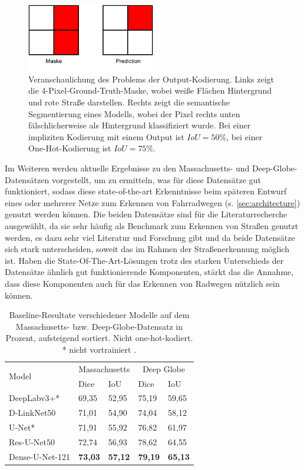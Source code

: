 \begin{figure}
	\centering
	\includegraphics[width=0.5\textwidth]{Bilder/output-enc-example.drawio.pdf} 
	\vspace{-5pt}
	\caption{Veranschaulichung des Problems der Output-Kodierung. Links zeigt die 4-Pixel-Ground-Truth-Maske, 
	wobei weiße Flächen Hintergrund und rote Straße darstellen. Rechts zeigt die semantische Segmentierung 
	eines Modells, wobei der Pixel rechts unten fälschlicherweise als Hintergrund klassifiziert wurde.
	Bei einer impliziten Kodierung mit einem Output ist $IoU = 50\%$, bei einer One-Hot-Kodierung ist $IoU = 75\%$.}
	\label{fig:problematic-output}
\end{figure} 

Im Weiteren werden aktuelle Ergebnisse zu den Massachusetts- und Deep-Globe-Datensätzen vorgestellt, 
um zu ermitteln, was für diese Datensätze gut funktioniert, sodass diese state-of-the-art Erkenntnisse beim 
späteren Entwurf eines oder mehrerer Netze zum Erkennen von Fahrradwegen (s. \autoref{sec:architecture}) 
genutzt werden können. Die beiden Datensätze sind für die Literaturrecherche ausgewählt, 
da sie sehr häufig als Benchmark zum Erkennen von Straßen genutzt werden, es dazu sehr viel Literatur und 
Forschung gibt und da beide Datensätze sich stark unterscheiden, soweit das im Rahmen der Straßenerkennung möglich ist. 
Haben die State-Of-The-Art-Lösungen trotz des starken Unterschieds der Datensätze ähnlich gut funktionierende
Komponenten, stärkt das die Annahme, dass diese Komponenten auch für das Erkennen von Radwegen nützlich sein können. 

\begin{table}[H]
	\centering
	\begin{tabular}{l|l|l|l|l}
		\multirow{2}{*}{Model} & \multicolumn{2}{c|}{Massachusetts} & \multicolumn{2}{c}{Deep Globe}  \\
		& Dice & IoU & Dice & IoU \\
		\midrule
		DeepLabv3+* & 69,35 & 52,95 & 75,19 & 59,65 \\
		D-LinkNet50 & 71,01 & 54,90 & 74,04 & 58,12 \\
		U-Net* & 71,91 & 55,92 & 76,82 & 61,97 \\
		Res-U-Net50 & 72,74 & 56,93 & 78,62 & 64,55  \\
		Dense-U-Net-121 & \textbf{73,03} & \textbf{57,12} & \textbf{79,19} & \textbf{65,13}  \\
	\end{tabular}
	\caption{Baseline-Resultate verschiedener Modelle auf dem Massachusetts- 
	bzw. Deep-Globe-Datensatz in Prozent, aufsteigend sortiert. Nicht one-hot-kodiert. \\ * nicht vortrainiert \cite{C.Henry.2021}.}
	\label{tab:basline-benchmarks}
\end{table}

